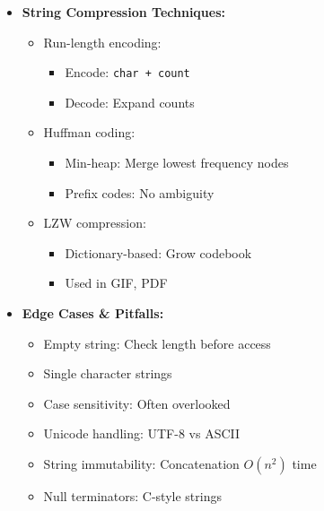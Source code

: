 \documentclass[a4paper,10pt]{book}
\begin{document}
\begin{itemize}
    \item \textbf{String Compression Techniques:}
    \begin{itemize}
        \item Run-length encoding:
        \begin{itemize}
            \item Encode: \texttt{char + count}
            \item Decode: Expand counts
        \end{itemize}
        \item Huffman coding:
        \begin{itemize}
            \item Min-heap: Merge lowest frequency nodes
            \item Prefix codes: No ambiguity
        \end{itemize}
        \item LZW compression:
        \begin{itemize}
            \item Dictionary-based: Grow codebook
            \item Used in GIF, PDF
        \end{itemize}
    \end{itemize}
    
    \item \textbf{Edge Cases \& Pitfalls:}
    \begin{itemize}
        \item Empty string: Check length before access
        \item Single character strings
        \item Case sensitivity: Often overlooked
        \item Unicode handling: UTF-8 vs ASCII
        \item String immutability: Concatenation $O(n^2)$ time
        \item Null terminators: C-style strings
    \end{itemize}
    

\end{itemize}
\end{document}
